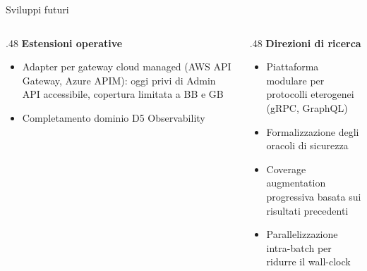 
\begin{frame}{Sviluppi futuri}
  \begin{columns}
    \begin{column}{.48\textwidth}
      \textbf{Estensioni operative}
      \begin{itemize}
        \item Adapter per \alert{gateway cloud managed} (AWS API Gateway, Azure APIM): oggi privi di Admin API accessibile, copertura limitata a BB e GB

        \item Completamento dominio \alert{D5 Observability}
      \end{itemize}
    \end{column}

    \begin{column}{.48\textwidth}
      \textbf{Direzioni di ricerca}
      \begin{itemize}
        \item Piattaforma modulare per \alert{protocolli eterogenei} (gRPC, GraphQL)

        \item \alert{Formalizzazione} degli oracoli di sicurezza

        \item \alert{Coverage augmentation} progressiva basata sui risultati precedenti

        \item \alert{Parallelizzazione} intra-batch per ridurre il wall-clock
      \end{itemize}
    \end{column}
  \end{columns}
\end{frame}